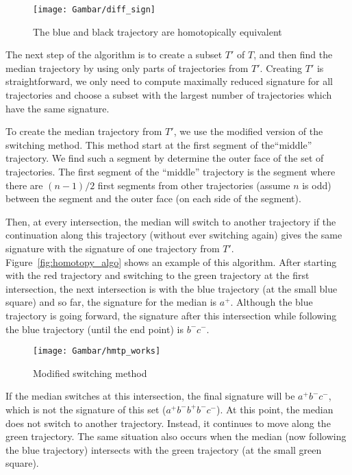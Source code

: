 \begin{figure}
\centering
\texttt{[image: Gambar/diff\_sign]}
\caption[The blue and black trajectory are homotopically equivalent \cite{Lionov:2009}]{The blue and black trajectory are homotopically equivalent \cite{Lionov:2009}} 
\end{figure}

The next step of the algorithm is to create a subset $T'$ of $T$, and then find the median trajectory by using only parts of trajectories from $T'$.
Creating $T'$ is straightforward, we only need to compute maximally reduced signature for all trajectories and choose a subset with the largest number of trajectories which have the same signature.

To create the median trajectory from $T'$, we use the modified version of the switching method.
This method start at the first segment of the``middle'' trajectory.
We find such a segment by determine the outer face of the set of trajectories.
The first segment of the ``middle'' trajectory is the segment where there are $(n-1)/2$ first segments from other trajectories (assume $n$ is odd) between the segment and the outer face (on each side of the segment).


Then, at every intersection, the median will switch to another trajectory if the continuation along this trajectory (without ever switching again) gives the same signature with the signature of one trajectory from $T'$.
Figure~\ref{fig:homotopy_algo} shows an example of this algorithm.
After starting with the red trajectory and switching to the green trajectory at the first intersection, the next intersection is with the blue trajectory (at the small blue square) and so far, the signature for the median is \textit{$a^{+}$}. 
Although the blue trajectory is going forward, the signature after this intersection while following the blue trajectory (until the end point) is \textit{$b^{-}c^{-}$}. 

\begin{figure}
\centering
\texttt{[image: Gambar/hmtp\_works]}
\caption[Modified switching method \cite{Lionov:2009}]{Modified switching method \cite{Lionov:2009}} 
\end{figure}

If the median switches at this intersection, the final signature will be \textit{$a^{+}b^{-}c^{-}$}, which is not the signature of this set (\textit{$a^{+}b^{-}b^{+}b^{-}c^{-}$}). 
At this point, the median does not switch to another trajectory. 
Instead, it continues to move along the green trajectory. 
The same situation also occurs when the median (now following the blue trajectory) intersects with the green trajectory (at the small green square).

